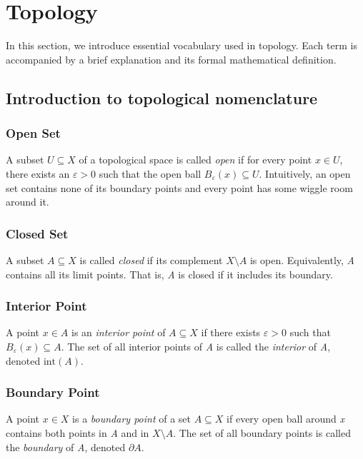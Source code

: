 \newpage
\section{Topology}

In this section, we introduce essential vocabulary used in topology. Each term is accompanied by a 
brief explanation and its formal mathematical definition.

\subsection{Introduction to topological nomenclature}

\subsubsection{Open Set}
	     
A subset \( U \subseteq X \) of a topological space is called 
\emph{open} if for every point \( x \in U \), there exists an \( \varepsilon > 0 \) 
such that the open ball \( B_\varepsilon(x) \subseteq U \). 
Intuitively, an open set contains none of its boundary points and every point has some 
wiggle room around it.

\subsubsection{Closed Set} 
	      
A subset \( A \subseteq X \) is called \emph{closed} if its 
complement \( X \setminus A \) is open. Equivalently, \emph{A} contains all its limit points. 
That is, \emph{A} is closed if it includes its boundary.

\subsubsection{Interior Point}

A point \( x \in A \) is an \emph{interior point} of \( A \subseteq X \) if there 
exists \( \varepsilon > 0 \) such that \( B_\varepsilon(x) \subseteq A \). 
The set of all interior points of \emph{A} is called the \emph{interior} of \emph{A}, 
denoted \( \mathrm{int}(A) \).

\subsubsection{Boundary Point}
	      
A point \( x \in X \) is a \emph{boundary point} of a set \( A \subseteq X \) 
if every open ball around \emph{x} contains both points in \emph{A} and in \( X \setminus A \). 
The set of all boundary points is called the \emph{boundary} of \emph{A}, denoted \( \partial A \).

